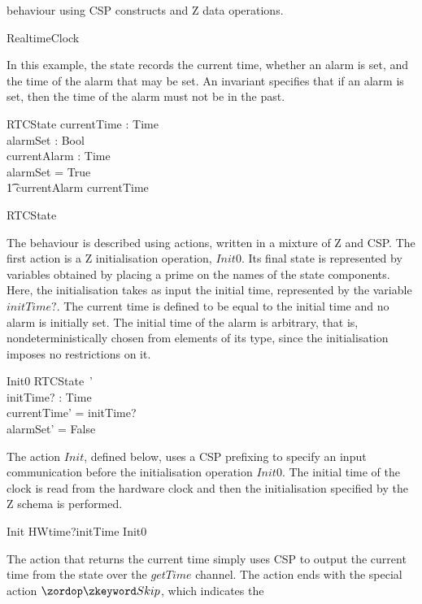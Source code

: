 \documentclass[a4paper,10pt]{report}
\begin{document}
behaviour using CSP constructs and Z data operations.
%
\begin{circus}
  \circprocess RealtimeClock \circdef \circbegin
\end{circus}
%
In this example, the state records the current time, whether an alarm
is set, and the time of the alarm that may be set.
An invariant specifies that if an alarm is set, then the time of the
alarm must not be in the past.
%
\begin{schema}{RTCState}
  currentTime  : Time \\
  alarmSet     : Bool \\
  currentAlarm : Time \\
\where
  alarmSet = True \implies \\
  \t1 currentAlarm \geq currentTime
\end{schema}
\begin{circusaction}
  \circstate RTCState
\end{circusaction}
%
The behaviour is described using actions, written in a mixture of Z
and CSP.
The first action is a Z initialisation operation, $Init0$.
Its final state is represented by variables obtained by placing a
prime on the names of the state components.
Here, the initialisation takes as input the initial time, represented
by the variable $initTime?$.
The current time is defined to be equal to the initial time and no
alarm is initially set.
The initial time of the alarm is arbitrary, that is,
nondeterministically chosen from elements of its type, since the
initialisation imposes no restrictions on it.
%
\begin{schema}{Init0}
  RTCState~' \\
  initTime?{} : Time \\
\where 
  currentTime' = initTime?{} \\
  alarmSet' = False \\
\end{schema}
%
The action $Init$, defined below, uses a CSP prefixing to specify an
input communication before the initialisation operation $Init0$.
The initial time of the clock is read from the hardware clock and then
the initialisation specified by the Z schema is performed.
%
\begin{circusaction}
  Init \circdef HWtime?initTime \then Init0
\end{circusaction}
%
The action that returns the current time simply uses CSP to output the
current time from the state over the $getTime$ channel.
The action ends with the special action $\Skip$, which indicates the
\end{document}
